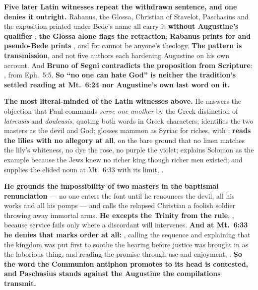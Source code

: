 \textbf{Five later Latin witnesses repeat the withdrawn sentence, and one denies
it outright.} Rabanus, the Glossa, Christian of Stavelot, Paschasius and the
exposition printed under Bede's name all carry it \textbf{without Augustine's
qualifier }; \textbf{the Glossa alone flags the retraction};
\textbf{Rabanus prints  for  and pseudo-Bede prints
}, and 
for  cannot be anyone's theology. \textbf{The pattern is
transmission}, and not five authors each hardening Augustine on his own account. And \textbf{Bruno of Segni contradicts the proposition
from Scripture}: , from Eph.\ 5:5.
\textbf{So ``no one can hate God'' is neither the tradition's settled reading
at Mt.\ 6:24 nor Augustine's own last word on it.}

\begin{witnessnote}
 \textbf{The most
literal-minded of the Latin witnesses above.} He answers the objection that
Paul commands \emph{serve one another} by the Greek distinction of
\emph{latreusis} and \emph{douleusis}, quoting both words in Greek characters;
identifies the two masters as the devil and God; glosses mammon as Syriac for
riches, with ;
\textbf{reads the lilies with no allegory at all}, on the bare ground that no
linen matches the lily's whiteness, no dye the rose, no purple the violet;
explains Solomon as the example because the Jews knew no richer king though
richer men existed; and supplies the elided
noun at Mt.\ 6:33 with its limit, .
\end{witnessnote}

\begin{witnessnote}
 \textbf{He grounds the
impossibility of two masters in the baptismal renunciation} --- no one enters
the font until he renounces the devil, all his works and all his pomps --- and
calls the relapsed Christian a foolish soldier throwing away immortal arms.
\textbf{He excepts the Trinity from the rule}, , because service fails only where a
discordant will intervenes. \textbf{And at Mt.\ 6:33 he denies that
 marks order at all:} , calling the sequence  and explaining that
the kingdom was put first to soothe the hearing before justice was brought in as
the laborious thing, and reading the promise through use and enjoyment,
. \textbf{So the word
the Communion antiphon promotes to its head is contested, and Paschasius stands
against the Augustine the compilations transmit.}
\end{witnessnote}

